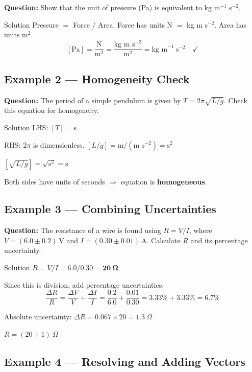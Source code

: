 \textbf{Question:} Show that the unit of pressure (Pa) is equivalent to kg m$^{-1}$ s$^{-2}$.

\begin{examplebox}{Solution}
Pressure $= $ Force / Area. Force has units N $=$ kg m s$^{-2}$. Area has units m$^2$.
$$[\text{Pa}] = \frac{\text{N}}{\text{m}^2} = \frac{\text{kg m s}^{-2}}{\text{m}^2} = \text{kg m}^{-1}\ \text{s}^{-2} \quad \checkmark$$
\end{examplebox}

\subsection*{Example 2 --- Homogeneity Check}

\textbf{Question:} The period of a simple pendulum is given by $T = 2\pi\sqrt{L/g}$. Check this equation for homogeneity.

\begin{examplebox}{Solution}
LHS: $[T] = \text{s}$

RHS: $2\pi$ is dimensionless. $[L/g] = \text{m} / (\text{m s}^{-2}) = \text{s}^2$

$[\sqrt{L/g}] = \sqrt{\text{s}^2} = \text{s}$

Both sides have units of seconds $\Rightarrow$ equation is \textbf{homogeneous}. \checkmark
\end{examplebox}

\subsection*{Example 3 --- Combining Uncertainties}

\textbf{Question:} The resistance of a wire is found using $R = V/I$, where $V = (6.0 \pm 0.2)\ \text{V}$ and $I = (0.30 \pm 0.01)\ \text{A}$. Calculate $R$ and its percentage uncertainty.

\begin{examplebox}{Solution}
$R = V/I = 6.0/0.30 = \mathbf{20\ \Omega}$

Since this is division, add percentage uncertainties:
$$\frac{\Delta R}{R} = \frac{\Delta V}{V} + \frac{\Delta I}{I} = \frac{0.2}{6.0} + \frac{0.01}{0.30} = 3.33\% + 3.33\% = \mathbf{6.7\%}$$

Absolute uncertainty: $\Delta R = 0.067 \times 20 = 1.3\ \Omega$

$R = (20 \pm 1)\ \Omega$
\end{examplebox}

\subsection*{Example 4 --- Resolving and Adding Vectors}

